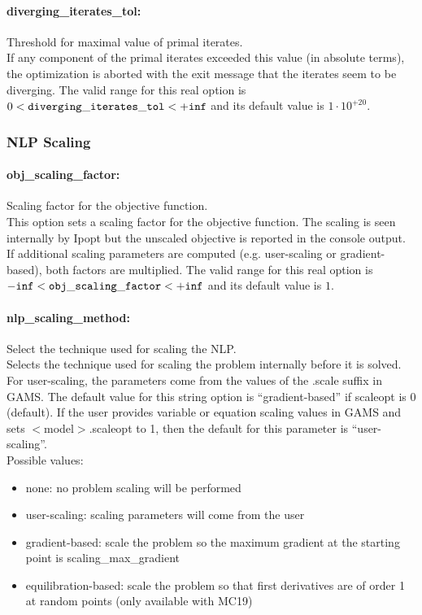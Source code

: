 \paragraph{diverging\_iterates\_tol:} Threshold for maximal value of primal iterates. $\;$ \\
 If any component of the primal iterates exceeded
this value (in absolute terms), the optimization
is aborted with the exit message that the
iterates seem to be diverging. The valid range for this real option is 
$0 <  {\tt diverging\_iterates\_tol } <  {\tt +inf}$
and its default value is $1 \cdot 10^{+20}$.

\subsubsection{NLP Scaling}

\paragraph{obj\_scaling\_factor:} Scaling factor for the objective function. $\;$ \\
 This option sets a scaling factor for the
objective function. The scaling is seen
internally by Ipopt but the unscaled objective is
reported in the console output. If additional
scaling parameters are computed (e.g.
user-scaling or gradient-based), both factors are
multiplied. The valid range for this real option is 
${\tt -inf} <  {\tt obj\_scaling\_factor } <  {\tt +inf}$
and its default value is $1$.


\paragraph{nlp\_scaling\_method:} Select the technique used for scaling the NLP. $\;$ \\
 Selects the technique used for scaling the
problem internally before it is solved. For
user-scaling, the parameters come from the values of the .scale suffix in GAMS.
The default value for this string option is ``gradient-based'' if scaleopt is 0 (default).
If the user provides variable or equation scaling values in GAMS and sets $<$model$>$.scaleopt to 1, then the default for this parameter is ``user-scaling''.
\\ 
Possible values:
\begin{itemize}
   \item none: no problem scaling will be performed
   \item user-scaling: scaling parameters will come from the user
   \item gradient-based: scale the problem so the maximum gradient at
the starting point is scaling\_max\_gradient
   \item equilibration-based: scale the problem so that first derivatives are
of order 1 at random points (only available with MC19)
\end{itemize}

